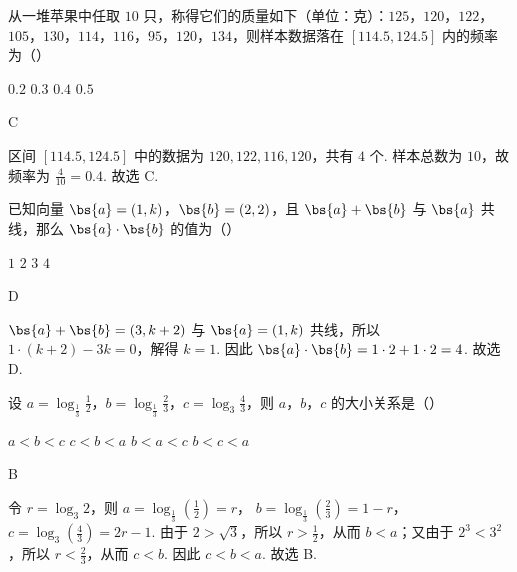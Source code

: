 \begin{problem}
从一堆苹果中任取 \(10\) 只，称得它们的质量如下（单位：\(\text{克}\)）：\(125\)，\(120\)，\(122\)，\(105\)，\(130\)，\(114\)，\(116\)，\(95\)，\(120\)，\(134\)，则样本数据落在 \(\left[114.5,124.5\right]\) 内的频率为（\quad）

\choices
    {\(0.2\)}
    {\(0.3\)}
    {\(0.4\)}
    {\(0.5\)}
\end{problem}

\begin{answer}
    C
\end{answer}

\begin{solution}
区间 \([114.5,124.5]\) 中的数据为 \(120,122,116,120\)，共有 \(4\) 个. 样本总数为 \(10\)，故频率为
\(\frac{4}{10}=0.4\). 故选 C.
\end{solution}

\begin{problem}
已知向量 \(\bs{a} = (1, k)\)，\(\bs{b} = (2, 2)\)，且 \(\bs{a} + \bs{b}\) 与 \(\bs{a}\) 共线，那么 \(\bs{a} \cdot \bs{b}\) 的值为（\quad）

\choices
    {\(1\)}
    {\(2\)}
    {\(3\)}
    {\(4\)}
\end{problem}

\begin{answer}
    D
\end{answer}

\begin{solution}
\(\bs{a}+\bs{b}=(3,k+2)\) 与 \(\bs{a}=(1,k)\) 共线，所以
\(1\cdot(k+2)-3k=0\)，解得 \(k=1\). 因此
\(\bs{a}\cdot\bs{b}=1\cdot2+1\cdot2=4\). 故选 D.
\end{solution}

\begin{problem}
设 \(a = \log_{\frac{1}{3}} \frac{1}{2}\)，\(b = \log_{\frac{1}{3}} \frac{2}{3}\)，\(c = \log_3 \frac{4}{3}\)，则 \(a\)，\(b\)，\(c\) 的大小关系是（\quad）

\choices
    {\(a < b < c\)}
    {\(c < b < a\)}
    {\(b < a < c\)}
    {\(b < c < a\)}
\end{problem}

\begin{answer}
    B
\end{answer}

\begin{solution}
令 \(r=\log_{3}2\)，则
\(a=\log_{\frac{1}{3}}(\frac{1}{2})=r\)，
\(b=\log_{\frac{1}{3}}(\frac{2}{3})=1-r\)，
\(c=\log_{3}(\frac{4}{3})=2r-1\). 由于 \(2>\sqrt{3}\)，所以 \(r>\frac12\)，从而 \(b<a\)；又由于 \(2^{3}<3^{2}\)，所以 \(r<\frac23\)，从而 \(c<b\). 因此 \(c<b<a\). 故选 B.
\end{solution}

